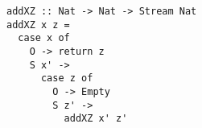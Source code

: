 \begin{figure}[!b]
  \centering
  \begin{minipage}{\columnwidth}
    \begin{lstlisting}[label={add_x_z}, caption={Function for \lstinline{addo in out in} direction}, captionpos=b, frame=tb]
addXZ :: Nat -> Nat -> Stream Nat
addXZ x z =
  case x of
    O -> return z
    S x' ->
      case z of
        O -> Empty
        S z' ->
          addXZ x' z'
    \end{lstlisting}
  \end{minipage}
\end{figure}
